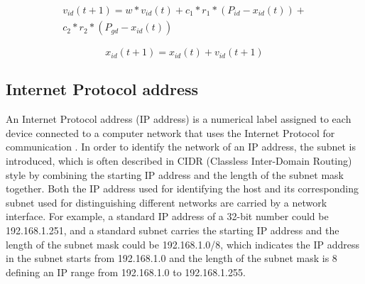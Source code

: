\documentclass[conference]{IEEEtran}
\begin{document}
\begin{equation}\label{eq:UpdateV}
	\begin{aligned}
	v_{id}(t+1) = w * v_{id}(t) + c_{1} * r_{1} * (P_{id} - x_{id}(t)) + \\
	c_{2} * r_{2} * (P_{gd} - x_{id}(t))
	\end{aligned}
\end{equation}

\begin{equation}\label{eq:UpdateX}
	x_{id}(t+1) = x_{id}(t) + v_{id}(t+1)
\end{equation}

\subsection{Internet Protocol address}\label{sec:IPAddress}

An Internet Protocol address (IP address) is a numerical label assigned to each device connected to a computer network that uses the Internet Protocol for communication \cite{IP:Postel}. In order to identify the network of an IP address, the subnet is introduced, which is often described in CIDR (Classless Inter-Domain Routing) style \cite{CIDR:Fuller} by combining the starting IP address and the length of the subnet mask together. Both the IP address used for identifying the host and its corresponding subnet used for distinguishing different networks are carried by a network interface. For example, a standard IP address of a 32-bit number could be 192.168.1.251, and a standard subnet carries the starting IP address and the length of the subnet mask could be 192.168.1.0/8, which indicates the IP address in the subnet starts from 192.168.1.0 and the length of the subnet mask is 8 defining an IP range from 192.168.1.0 to 192.168.1.255.
\end{document}
